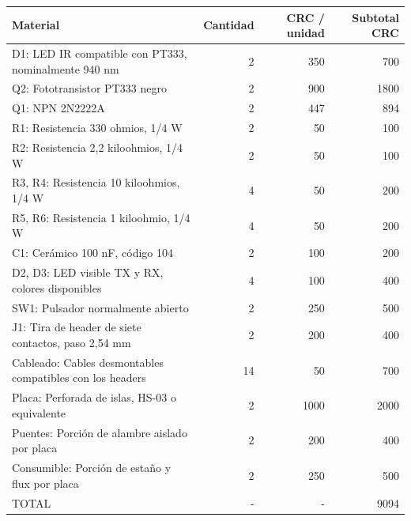 {\small
\begin{longtable}{P{8.5cm} r r r}
\toprule
Material & Cantidad & CRC / unidad & Subtotal CRC\\
\midrule\endhead
D1: LED IR compatible con PT333, nominalmente 940 nm & 2 & 350 & 700\\
Q2: Fototransistor PT333 negro & 2 & 900 & 1800\\
Q1: NPN 2N2222A & 2 & 447 & 894\\
R1: Resistencia 330 ohmios, 1/4 W & 2 & 50 & 100\\
R2: Resistencia 2,2 kiloohmios, 1/4 W & 2 & 50 & 100\\
R3, R4: Resistencia 10 kiloohmios, 1/4 W & 4 & 50 & 200\\
R5, R6: Resistencia 1 kiloohmio, 1/4 W & 4 & 50 & 200\\
C1: Cerámico 100 nF, código 104 & 2 & 100 & 200\\
D2, D3: LED visible TX y RX, colores disponibles & 4 & 100 & 400\\
SW1: Pulsador normalmente abierto & 2 & 250 & 500\\
J1: Tira de header de siete contactos, paso 2,54 mm & 2 & 200 & 400\\
Cableado: Cables desmontables compatibles con los headers & 14 & 50 & 700\\
Placa: Perforada de islas, HS-03 o equivalente & 2 & 1000 & 2000\\
Puentes: Porción de alambre aislado por placa & 2 & 200 & 400\\
Consumible: Porción de estaño y flux por placa & 2 & 250 & 500\\
TOTAL & - & - & 9094\\
\bottomrule
\end{longtable}}
